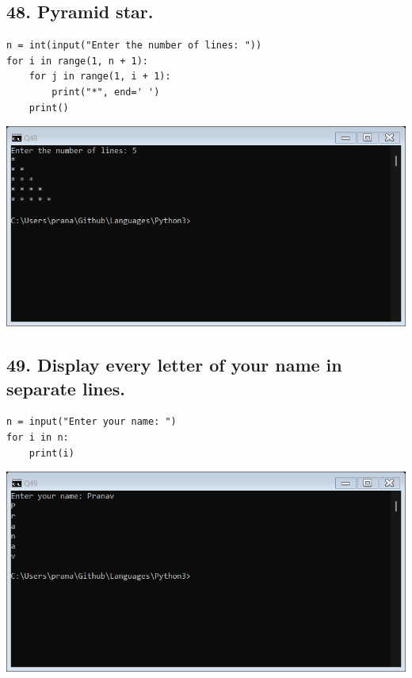 \documentclass[12pt]{article}
\begin{document}
\subsection*{48. Pyramid star.}
\begin{verbatim}
n = int(input("Enter the number of lines: "))
for i in range(1, n + 1):
    for j in range(1, i + 1):
        print("*", end=' ')
    print()
\end{verbatim}
\includegraphics[width=\linewidth]{images/48.png}

\subsection*{49. Display every letter of your name in separate lines.}
\begin{verbatim}
n = input("Enter your name: ")
for i in n:
    print(i)
\end{verbatim}
\includegraphics[width=\linewidth]{images/49.png}
\end{document}

